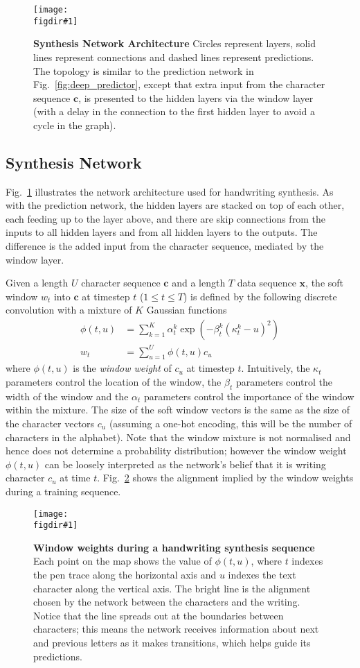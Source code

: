 \documentclass{article}
\newcommand{\flabel}[1]{\label{fig:#1}}
\newcommand{\fref}[1]{Fig.~\ref{fig:#1}}
\newcommand{\seq}[1]{\mathbf{#1}}
\newcommand{\invble}{x}
\newcommand{\inseq}{\seq{\invble}}
\newcommand{\ann}{\seq{c}}
\newcommand{\expo}[1]{\exp\left(#1\right)}
\newcommand{\figdir}{}
\newcommand{\capt}[2]{\caption[#1]{\textbf{#1}#2}}
\newcommand{\fig}[5]
{
\begin{figure}
\begin{center}
\texttt{[image: \\figdir\#1]}
\end{center}
\capt{#4}{#5}
\flabel{#2}
\end{figure}
}
\begin{document}
\fig{synth_net_two_layers}{synth_net}{1}{Synthesis Network Architecture}{ Circles represent layers, solid lines represent connections and dashed lines represent predictions. The topology is similar to the prediction network in \fref{deep_predictor}, except that extra input from the character sequence $\ann$, is presented to the hidden layers via the window layer (with a delay in the connection to the first hidden layer to avoid a cycle in the graph).}

\subsection{Synthesis Network}

\fref{synth_net} illustrates the network architecture used for handwriting synthesis.
As with the prediction network, the hidden layers are stacked on top of each other, each feeding up to the layer above, and there are skip connections from the inputs to all hidden layers and from all hidden layers to the outputs. 
The difference is the added input from the character sequence, mediated by the window layer.

Given a length $U$ character sequence $\ann$ and a length $T$ data sequence $\inseq$, the soft window $w_t$ into $\ann$ at timestep $t$ ($1 \leq t \leq T$) is defined by the following discrete convolution with a mixture of $K$ Gaussian functions
\begin{align}
\phi(t, u) &= \sum_{k=1}^K{\alpha^k_t\expo{-\beta_t^k\left(\kappa_t^k-u\right)^2}}\\
w_t &= \sum_{u=1}^U{\phi(t, u)c_u}
\end{align}
where $\phi(t, u)$ is the \emph{window weight} of $c_u$ at timestep $t$.
Intuitively, the $\kappa_t$ parameters control the location of the window, the $\beta_t$ parameters control the width of the window and the $\alpha_t$ parameters control the importance of the window within the mixture.
The size of the soft window vectors is the same as the size of the character vectors $c_u$ (assuming a one-hot encoding, this will be the number of characters in the alphabet).
Note that the window mixture is not normalised and hence does not determine a probability distribution; however the window weight $\phi(t, u)$ can be loosely interpreted as the network's belief that it is writing character $c_u$ at time $t$.
\fref{window_weights} shows the alignment implied by the window weights during a training sequence.

\fig{window_weights}{window_weights}{1}{Window weights during a handwriting synthesis sequence}{ Each point on the map shows the value of $\phi(t, u)$, where $t$ indexes the pen trace along the horizontal axis and $u$ indexes the text character along the vertical axis. The bright line is the alignment chosen by the network between the characters and the writing. Notice that the line spreads out at the boundaries between characters; this means the network receives information about next and previous letters as it makes transitions, which helps guide its predictions.}
\end{document}
